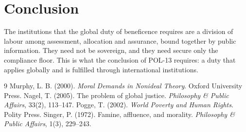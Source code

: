 \documentclass{situationist-preprint}
\begin{document}
\section{Conclusion}

The institutions that the global duty of beneficence requires are a division of labour among assessment, allocation and assurance, bound together by public information. They need not be sovereign, and they need secure only the compliance floor. This is what the conclusion of POL-13 requires: a duty that applies globally and is fulfilled through international institutions.

\begin{thebibliography}{9}\small
{} Murphy, L. B. (2000). \emph{Moral Demands in Nonideal Theory}. Oxford University Press.
 Nagel, T. (2005). The problem of global justice. \emph{Philosophy \& Public Affairs}, 33(2), 113--147.
 Pogge, T. (2002). \emph{World Poverty and Human Rights}. Polity Press.
 Singer, P. (1972). Famine, affluence, and morality. \emph{Philosophy \& Public Affairs}, 1(3), 229--243.
\end{thebibliography}
\end{document}
